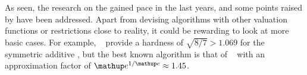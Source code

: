 As seen, the research on the \NSW{} gained pace in the last years, and some points raised by \citeauthor{APNSWuSVþUM} have been addressed.
Apart from devising algorithms with other valuation functions or restrictions close to reality, it could be rewarding to look at more basic cases.
For example, \citeauthor{satiation_in_fisher_markets_and_approx_of_nsw}~\cite{satiation_in_fisher_markets_and_approx_of_nsw} provide a hardness of \(\sqrt{8/7} > 1.069\) for the symmetric additive \NSW, but the best known algorithm is that of \citeauthor{finding_fair_and_efficient_allocs}~\cite{finding_fair_and_efficient_allocs} with an approximation factor of \(\euler^{1/\euler} \approx 1.45\).





